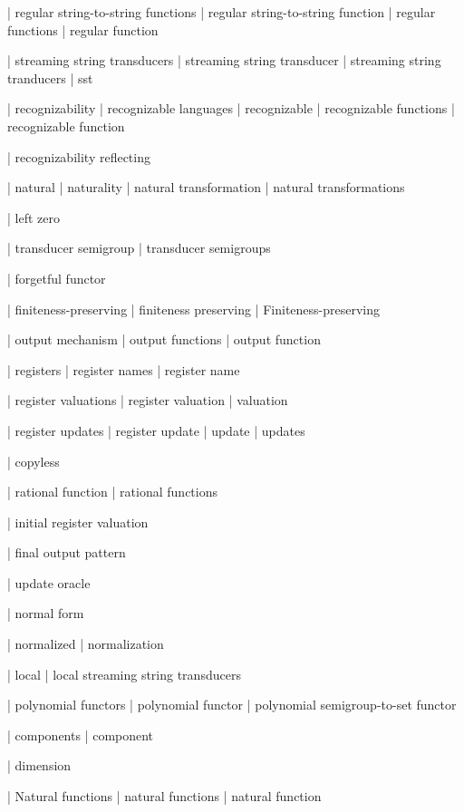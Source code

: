  | regular string-to-string functions
 | regular string-to-string function
 | regular functions
 | regular function

| streaming string transducers
 | streaming string transducer
| streaming string tranducers
| sst

| recognizability
| recognizable languages
| recognizable
| recognizable functions
| recognizable function

| recognizability reflecting

| natural
| naturality
| natural transformation
| natural transformations

| left zero

| transducer semigroup
| transducer semigroups

| forgetful functor

| finiteness-preserving
| finiteness preserving
| Finiteness-preserving

| output mechanism
| output functions
| output function

| registers
| register names
| register name

| register valuations
| register valuation
| valuation

| register updates
| register update
| update
| updates

| copyless

| rational function
| rational functions

| initial register valuation

| final output pattern

| update oracle

| normal form

| normalized
| normalization

| local
| local streaming string transducers

| polynomial functors
| polynomial functor
| polynomial semigroup-to-set functor

| components
| component

| dimension

| Natural functions
| natural functions
| natural function

